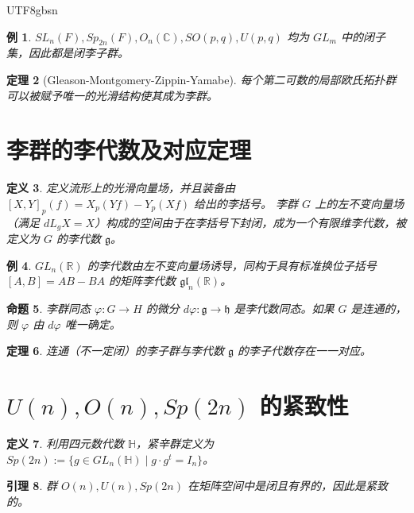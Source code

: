 \documentclass[11pt]{article}
\newtheorem{theorem}{定理}[section]
\newtheorem{lemma}[theorem]{引理}
\newtheorem{proposition}[theorem]{命题}
\newtheorem{definition}[theorem]{定义}
\newtheorem{example}[theorem]{例}
\begin{document}
\begin{CJK*}{UTF8}{gbsn}
\begin{example}
$SL_n(F), Sp_{2n}(F), O_n(\mathbb{C}), SO(p,q), U(p,q)$ 均为 $GL_m$ 中的闭子集，因此都是闭李子群。
\end{example}

\begin{theorem}[Gleason-Montgomery-Zippin-Yamabe]
每个第二可数的局部欧氏拓扑群可以被赋予唯一的光滑结构使其成为李群。
\end{theorem}

\section{李群的李代数及对应定理}

\begin{definition}
定义流形上的光滑向量场，并且装备由 $[X, Y]_p(f) = X_p(Yf) - Y_p(Xf)$ 给出的李括号。
李群 $G$ 上的左不变向量场（满足 $dL_g X = X$）构成的空间由于在李括号下封闭，成为一个有限维李代数，被定义为 $G$ 的李代数 $\mathfrak{g}$。
\end{definition}

\begin{example}
$GL_n(\mathbb{R})$ 的李代数由左不变向量场诱导，同构于具有标准换位子括号 $[A, B] = AB - BA$ 的矩阵李代数 $\mathfrak{gl}_n(\mathbb{R})$。
\end{example}

\begin{proposition}
李群同态 $\varphi: G \to H$ 的微分 $d\varphi: \mathfrak{g} \to \mathfrak{h}$ 是李代数同态。如果 $G$ 是连通的，则 $\varphi$ 由 $d\varphi$ 唯一确定。
\end{proposition}

\begin{theorem}
连通（不一定闭）的李子群与李代数 $\mathfrak{g}$ 的李子代数存在一一对应。
\end{theorem}

\section{$U(n), O(n), Sp(2n)$ 的紧致性}

\begin{definition}
利用四元数代数 $\mathbb{H}$，紧辛群定义为 $Sp(2n) := \{g \in GL_n(\mathbb{H}) \mid g \cdot g^t = I_n\}$。
\end{definition}

\begin{lemma}
群 $O(n), U(n), Sp(2n)$ 在矩阵空间中是闭且有界的，因此是紧致的。
\end{lemma}


\end{CJK*}
\end{document}
